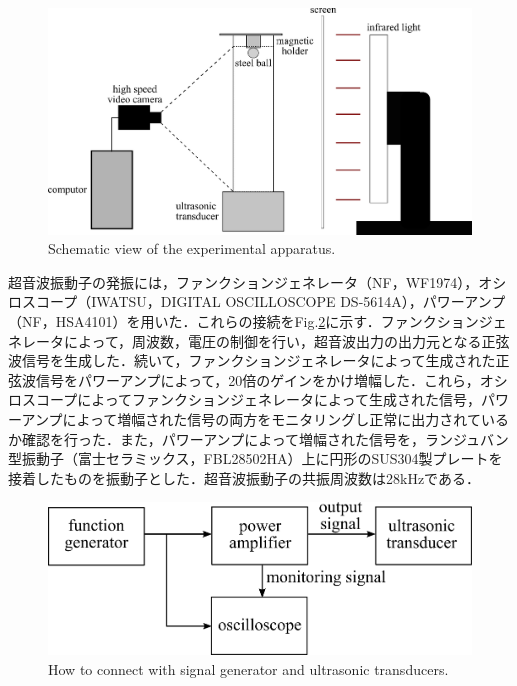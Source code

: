 \begin{center}
    \begin{figure}[h]
        \centering
        \includegraphics[clip,width=15.0cm]{2-Methods/device.png}
        \caption{Schematic view of the experimental apparatus.}
        \label{fig:device}
    \end{figure}
\end{center}

超音波振動子の発振には，ファンクションジェネレータ（NF，WF1974），オシロスコープ（IWATSU，DIGITAL OSCILLOSCOPE DS-5614A），パワーアンプ（NF，HSA4101）を用いた．これらの接続をFig.\ref{fig:connect-with-signal}に示す．ファンクションジェネレータによって，周波数，電圧の制御を行い，超音波出力の出力元となる正弦波信号を生成した．続いて，ファンクションジェネレータによって生成された正弦波信号をパワーアンプによって，20倍のゲインをかけ増幅した．これら，オシロスコープによってファンクションジェネレータによって生成された信号，パワーアンプによって増幅された信号の両方をモニタリングし正常に出力されているか確認を行った．また，パワーアンプによって増幅された信号を，ランジュバン型振動子（富士セラミックス，FBL28502HA）上に円形のSUS304製プレートを接着したものを振動子とした．超音波振動子の共振周波数は28kHzである．

\begin{figure}[h]
    \centering
    \includegraphics[clip,width=15.0cm]{2-Methods/connect-with-signal.png}
    \caption{How to connect with signal generator and ultrasonic transducers.}
    \label{fig:connect-with-signal}
\end{figure}
